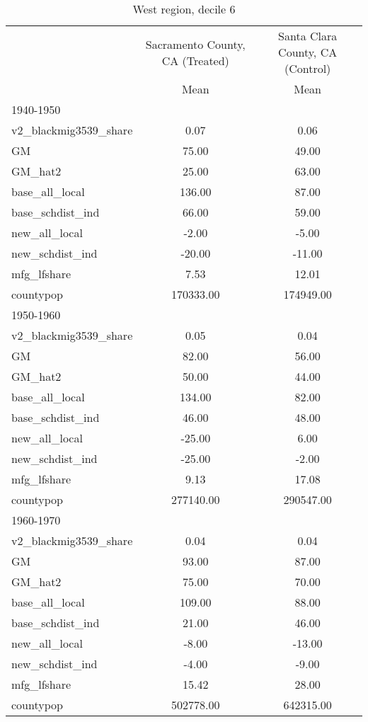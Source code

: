 \begin{table}[htbp]\centering
\def\sym#1{\ifmmode^{#1}\else\(^{#1}\)\fi}
\caption{West region, decile 6 \label{tab1}}
\begin{tabular}{l*{2}{c}}
\toprule
                    &\multicolumn{1}{c}{Sacramento County, CA (Treated)}&\multicolumn{1}{c}{Santa Clara County, CA (Control)}\\
                    &        Mean&        Mean\\
\midrule
1940-1950           &            &            \\
v2\_blackmig3539\_share&        0.07&        0.06\\
GM                  &       75.00&       49.00\\
GM\_hat2             &       25.00&       63.00\\
base\_all\_local      &      136.00&       87.00\\
base\_schdist\_ind    &       66.00&       59.00\\
new\_all\_local       &       -2.00&       -5.00\\
new\_schdist\_ind     &      -20.00&      -11.00\\
mfg\_lfshare         &        7.53&       12.01\\
countypop           &   170333.00&   174949.00\\
\midrule
1950-1960           &            &            \\
v2\_blackmig3539\_share&        0.05&        0.04\\
GM                  &       82.00&       56.00\\
GM\_hat2             &       50.00&       44.00\\
base\_all\_local      &      134.00&       82.00\\
base\_schdist\_ind    &       46.00&       48.00\\
new\_all\_local       &      -25.00&        6.00\\
new\_schdist\_ind     &      -25.00&       -2.00\\
mfg\_lfshare         &        9.13&       17.08\\
countypop           &   277140.00&   290547.00\\
\midrule
1960-1970           &            &            \\
v2\_blackmig3539\_share&        0.04&        0.04\\
GM                  &       93.00&       87.00\\
GM\_hat2             &       75.00&       70.00\\
base\_all\_local      &      109.00&       88.00\\
base\_schdist\_ind    &       21.00&       46.00\\
new\_all\_local       &       -8.00&      -13.00\\
new\_schdist\_ind     &       -4.00&       -9.00\\
mfg\_lfshare         &       15.42&       28.00\\
countypop           &   502778.00&   642315.00\\
\bottomrule
\end{tabular}
\end{table}
